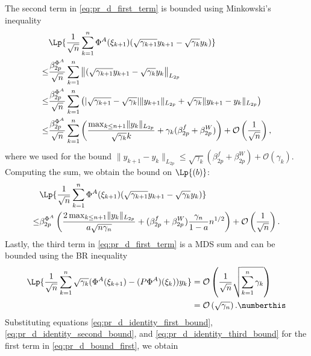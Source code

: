 \documentclass[11pt]{article}
\begin{document}
The second term in \eqref{eq:pr_d_first_term} is bounded using Minkowski's inequality
\begin{align*}
    &\Lp{\frac{1}{\sqrt{n}} \sum_{k=1}^n \Phi^A (\xi_{k+1}) (\sqrt{\gamma_{k+1}} y_{k+1} - \sqrt{\gamma_k} y_k)}
    \\
    \leq
    &\frac{\beta_{2p}^{\Phi^A}}{\sqrt{n}} \sum_{k=1}^n \left\lVert (\sqrt{\gamma_{k+1}}y_{k+1} - \sqrt{\gamma_k} y_k\right\rVert_{L_{2p}}
    \\ 
    \leq& \frac{\beta_{2p}^{\Phi^A}}{\sqrt{n}} \sum_{k=1}^n 
    \left(\lvert \sqrt{\gamma_{k+1}} - \sqrt{\gamma_k} \rvert \lVert y_{k+1} \rVert_{L_{2p}}
    + \sqrt{\gamma_k}\lVert y_{k+1} - y_k\rVert_{L_{2p}}
    \right)
    \\ 
    \leq& 
    \frac{\beta_{2p}^{\Phi^A}}{\sqrt{n}} 
    \sum_{k=1}^n \left(\frac{\max_{k \leq {n+1}} \lVert y_k \rVert_{L_{2p}}}{\sqrt{\gamma_k} k} + \gamma_k (\beta_{2p}^f + \beta_{2p}^W) \right)
    + 
    \mathcal{O}\left(\frac{1}{\sqrt{n}} \right)
    ,
\end{align*}
where we used  for the bound $\lVert y_{k+1} - y_k \rVert_{L_{2p}} \leq \sqrt{\gamma_k} (\beta_{2p}^f + \beta_{2p}^W) + \mathcal{O}(\gamma_k)$. 
Computing the sum, we obtain the bound on $\Lp{(b)}$:
\begin{equation}\label{eq:pr_d_identity_second_bound}
\begin{split}
    &\Lp{\frac{1}{\sqrt{n}} \sum_{k=1}^n \Phi^A (\xi_{k+1}) (\sqrt{\gamma_{k+1}} y_{k+1} - \sqrt{\gamma_k} y_k)}
    \\ 
    \leq &
        \beta_{2p}^{\Phi^A}
    \left(\frac{2 \max_{k \leq {n+1}} \lVert y_k \rVert_{L_{2p}} }{a \sqrt{n \gamma_n}} + (\beta_{2p}^f + \beta_{2p}^W) \frac{\gamma_n}{1-a} n^{1/2} \right)
    + \mathcal{O}\left(\frac{1}{\sqrt{n}} \right) . 
\end{split}
\end{equation}
Lastly, the third term in \eqref{eq:pr_d_first_term} is a MDS sum and can be bounded using the BR inequality
\begin{align*}
    \Lp{\frac{1}{\sqrt{n}} \sum_{k=1}^n \sqrt{\gamma_k} (\Phi^A (\xi_{k+1}) - (P\Phi^A) (\xi_k)) y_k }
    &= \mathcal{O}\left(\frac{1}{\sqrt{n}} \sqrt{\sum_{k=1}^n \gamma_k} \right)
    \\ &
    = \mathcal{O}\left( \sqrt{\gamma_n} \right).
    \numberthis \label{eq:pr_d_identity_third_bound}
\end{align*}
Substituting equations \eqref{eq:pr_d_identity_first_bound}, \eqref{eq:pr_d_identity_second_bound}, and \eqref{eq:pr_d_identity_third_bound} for the first term in \eqref{eq:pr_d_bound_first}, we obtain
\end{document}
